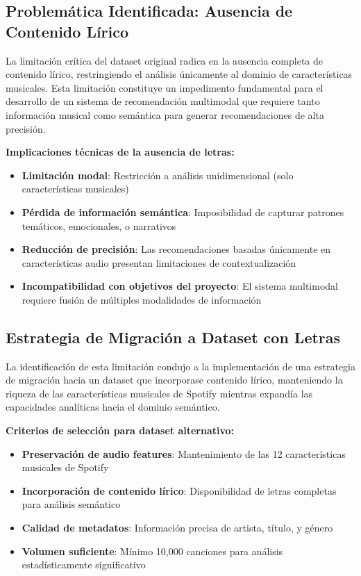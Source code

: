 \documentclass[12pt,a4paper]{article}
\begin{document}
\subsection{Problemática Identificada: Ausencia de Contenido Lírico}

La limitación crítica del dataset original radica en la ausencia completa de contenido lírico, restringiendo el análisis únicamente al dominio de características musicales. Esta limitación constituye un impedimento fundamental para el desarrollo de un sistema de recomendación multimodal que requiere tanto información musical como semántica para generar recomendaciones de alta precisión.

\textbf{Implicaciones técnicas de la ausencia de letras:}
\begin{itemize}[leftmargin=*]
    \item \textbf{Limitación modal}: Restricción a análisis unidimensional (solo características musicales)
    \item \textbf{Pérdida de información semántica}: Imposibilidad de capturar patrones temáticos, emocionales, o narrativos
    \item \textbf{Reducción de precisión}: Las recomendaciones basadas únicamente en características audio presentan limitaciones de contextualización
    \item \textbf{Incompatibilidad con objetivos del proyecto}: El sistema multimodal requiere fusión de múltiples modalidades de información
\end{itemize}

\subsection{Estrategia de Migración a Dataset con Letras}

La identificación de esta limitación condujo a la implementación de una estrategia de migración hacia un dataset que incorporase contenido lírico, manteniendo la riqueza de las características musicales de Spotify mientras expandía las capacidades analíticas hacia el dominio semántico.

\textbf{Criterios de selección para dataset alternativo:}
\begin{itemize}[leftmargin=*]
    \item \textbf{Preservación de audio features}: Mantenimiento de las 12 características musicales de Spotify
    \item \textbf{Incorporación de contenido lírico}: Disponibilidad de letras completas para análisis semántico
    \item \textbf{Calidad de metadatos}: Información precisa de artista, título, y género
    \item \textbf{Volumen suficiente}: Mínimo 10,000 canciones para análisis estadísticamente significativo
\end{itemize}
\end{document}
